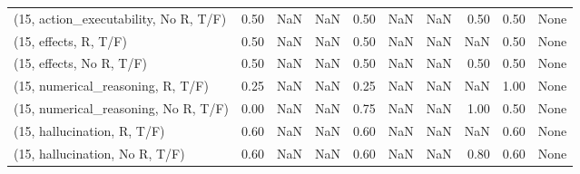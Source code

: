 \begin{table*}[h!]
\begin{adjustbox}{width=2\columnwidth,center}
\begin{tabular}{lrrr|rrr|rrr}
(15, action\_executability, No R, T/F) &                      0.50 &                   NaN &                       NaN &                          0.50 &                       NaN &                           NaN &                                   0.50 &                               0.50 &                                  None \\
(15, effects, R, T/F)                 &                      0.50 &                   NaN &                       NaN &                          0.50 &                       NaN &                           NaN &                                    NaN &                               0.50 &                                  None \\
(15, effects, No R, T/F)              &                      0.50 &                   NaN &                       NaN &                          0.50 &                       NaN &                           NaN &                                   0.50 &                               0.50 &                                  None \\
(15, numerical\_reasoning, R, T/F)     &                      0.25 &                   NaN &                       NaN &                          0.25 &                       NaN &                           NaN &                                    NaN &                               1.00 &                                  None \\
(15, numerical\_reasoning, No R, T/F)  &                      0.00 &                   NaN &                       NaN &                          0.75 &                       NaN &                           NaN &                                   1.00 &                               0.50 &                                  None \\
(15, hallucination, R, T/F)           &                      0.60 &                   NaN &                       NaN &                          0.60 &                       NaN &                           NaN &                                    NaN &                               0.60 &                                  None \\
(15, hallucination, No R, T/F)        &                      0.60 &                   NaN &                       NaN &                          0.60 &                       NaN &                           NaN &                                   0.80 &                               0.60 &                                  None \\

\end{tabular}
\end{adjustbox}
\end{table*}
